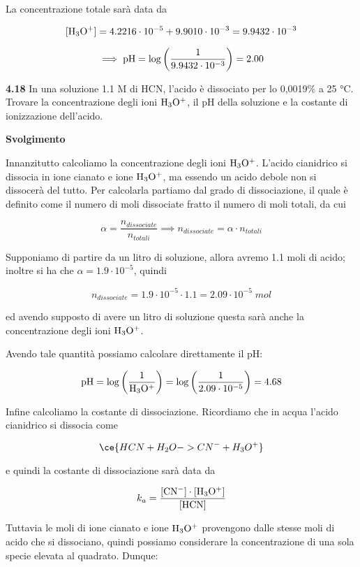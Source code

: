 La concentrazione totale sarà data da

$$[\rm H_3O^+]=4.2216 \cdot 10^{-5} + 9.9010\cdot 10^{-3}=9.9432 \cdot 10^{-3}$$

$$\implies
\rm pH=\log{\left(\frac{1}{9.9432 \cdot 10^{-3}}\right)}
=2.00$$

\vspace{0.2cm}\textbf{4.18}  In una soluzione 1.1 M di HCN, l'acido è dissociato per lo 0,0019\% a 25 °C. Trovare la concentrazione degli ioni $\rm H_3O^+$, il pH della soluzione e la costante di ionizzazione dell'acido. 

\vspace{0.2cm}\large\textbf{Svolgimento}\normalsize

\vspace{0.2cm}Innanzitutto calcoliamo la concentrazione degli ioni $\rm H_3O^+$. L'acido cianidrico si dissocia in ione cianato e ione $\rm H_3O^+$, ma essendo un acido debole non si dissocerà del tutto. Per calcolarla partiamo dal grado di dissociazione, il quale è definito come il numero di moli dissociate fratto il numero di moli totali, da cui

$$\alpha=\frac{n_{dissociate}}{n_{totali}}
\implies
n_{dissociate}=\alpha \cdot n_{totali}$$

Supponiamo di partire da un litro di soluzione, allora avremo 1.1 moli di acido; inoltre si ha che $\alpha=1.9 \cdot 10^{-5}$, quindi

$$n_{dissociate}=1.9 \cdot 10^{-5} \cdot 1.1
=2.09 \cdot 10^{-5}\;mol$$

ed avendo supposto di avere un litro di soluzione questa sarà anche la concentrazione degli ioni $\rm H_3O^+$.

Avendo tale quantità possiamo calcolare direttamente il pH:

$$\rm pH=\log{\left(\frac{1}{H_3O^+}\right)}
=\log{\left(\frac{1}{2.09 \cdot 10^{-5}}\right)}=4.68$$

Infine calcoliamo la costante di dissociazione. Ricordiamo che in acqua l'acido cianidrico si dissocia come

$$\ce{HCN + H_2O -> CN^- + H_3O^+}$$

e quindi la costante di dissociazione sarà data da

$$k_a=\rm \frac{[CN^-]\cdot[H_3O^+]}{[HCN]}$$

Tuttavia le moli di ione cianato e ione $\rm H_3O^+$ provengono dalle stesse moli di acido che si dissociano, quindi possiamo considerare la concentrazione di una sola specie elevata al quadrato. Dunque:

